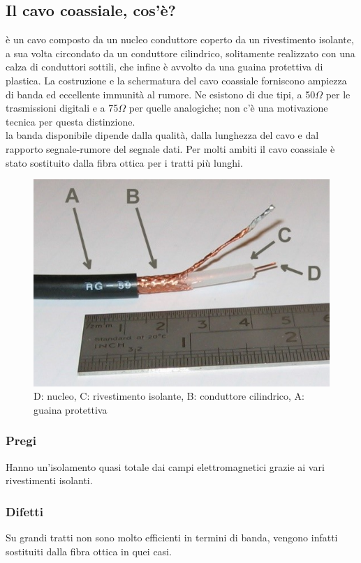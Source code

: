 \subsection{Il cavo coassiale, cos'è?} 
 è un cavo composto da un nucleo conduttore coperto da un rivestimento isolante, a sua volta circondato da un conduttore cilindrico, solitamente realizzato con una calza di conduttori sottili, che infine è avvolto da una guaina protettiva di plastica. La costruzione e la schermatura del cavo coassiale forniscono ampiezza di banda ed eccellente immunità al rumore. Ne esistono di due tipi, a 50$\Omega$ per le trasmissioni digitali e a 75$\Omega$ per quelle analogiche; non c’è una motivazione tecnica per questa distinzione. \\
la banda disponibile dipende dalla qualità, dalla lunghezza del cavo e dal rapporto segnale-rumore del segnale dati. Per molti ambiti il cavo coassiale è stato sostituito dalla fibra ottica per i tratti più lunghi.

\begin{figure}[H]
\centering
\includegraphics[scale=1]{res/img/3_cavoCoassiale.jpg}
\caption{D: nucleo, C: rivestimento isolante, B: conduttore cilindrico, A: guaina protettiva}
\end{figure}

\subsubsection{Pregi}
Hanno un'isolamento quasi totale dai campi elettromagnetici grazie ai vari rivestimenti isolanti. 

\subsubsection{Difetti}
Su grandi tratti non sono molto efficienti in termini di banda, vengono infatti sostituiti dalla fibra ottica in quei casi.

